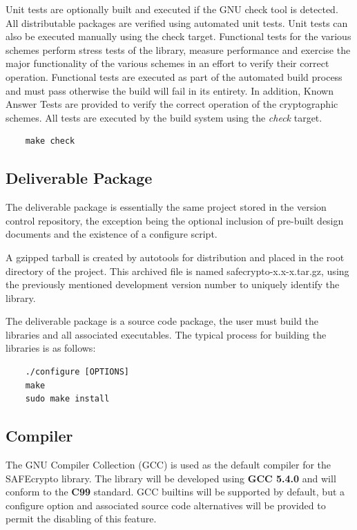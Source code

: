 Unit tests are optionally built and executed if the GNU check tool is detected. All distributable packages are verified using automated unit tests. Unit tests can also be executed manually using the check target. Functional tests for the various schemes perform stress tests of the library, measure performance and exercise the major functionality of the various schemes in an effort to verify their correct operation. Functional tests are executed as part of the automated build process and must pass otherwise the build will fail in its entirety. In addition, Known Answer Tests are provided to verify the correct operation of the cryptographic schemes. All tests are executed by the build system using the \textit{check} target.

\begin{verbatim}
    make check
\end{verbatim}


\subsection{Deliverable Package}

The deliverable package is essentially the same project stored in the version control repository, the exception being the optional inclusion of pre-built design documents and the existence of a configure script.

A gzipped tarball is created by autotools for distribution and placed in the root directory of the project. This archived file is named safecrypto-x.x-x.tar.gz, using the previously mentioned development version number to uniquely identify the library.

The deliverable package is a source code package, the user must build the libraries and all associated executables. The typical process for building the libraries is as follows:

\begin{verbatim}
    ./configure [OPTIONS]
    make
    sudo make install
\end{verbatim}


\subsection{Compiler}

The GNU Compiler Collection (GCC) is used as the default compiler for the SAFEcrypto library. The library will be developed using \textbf{GCC 5.4.0} and will conform to the \textbf{C99} standard. GCC builtins will be supported by default, but a configure option and associated source code alternatives will be provided to permit the disabling of this feature.


